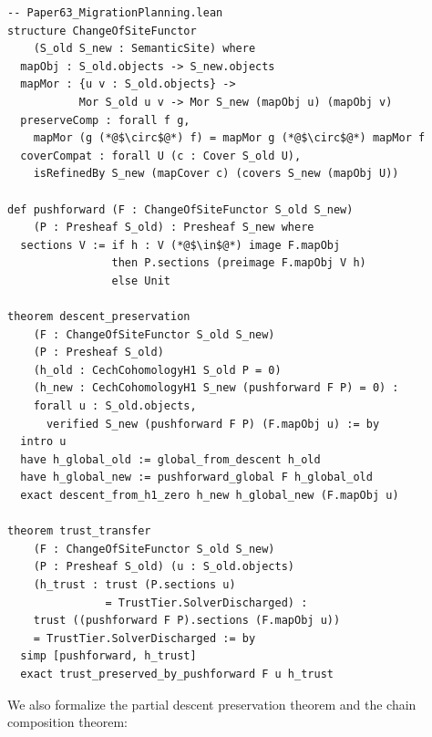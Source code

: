 \documentclass[11pt]{article}
\begin{document}
\begin{lstlisting}[style=jugeo-python,title=Lean 4 Formalization Sketch]
-- Paper63_MigrationPlanning.lean
structure ChangeOfSiteFunctor
    (S_old S_new : SemanticSite) where
  mapObj : S_old.objects -> S_new.objects
  mapMor : {u v : S_old.objects} ->
           Mor S_old u v -> Mor S_new (mapObj u) (mapObj v)
  preserveComp : forall f g,
    mapMor (g (*@$\circ$@*) f) = mapMor g (*@$\circ$@*) mapMor f
  coverCompat : forall U (c : Cover S_old U),
    isRefinedBy S_new (mapCover c) (covers S_new (mapObj U))

def pushforward (F : ChangeOfSiteFunctor S_old S_new)
    (P : Presheaf S_old) : Presheaf S_new where
  sections V := if h : V (*@$\in$@*) image F.mapObj
                then P.sections (preimage F.mapObj V h)
                else Unit

theorem descent_preservation
    (F : ChangeOfSiteFunctor S_old S_new)
    (P : Presheaf S_old)
    (h_old : CechCohomologyH1 S_old P = 0)
    (h_new : CechCohomologyH1 S_new (pushforward F P) = 0) :
    forall u : S_old.objects,
      verified S_new (pushforward F P) (F.mapObj u) := by
  intro u
  have h_global_old := global_from_descent h_old
  have h_global_new := pushforward_global F h_global_old
  exact descent_from_h1_zero h_new h_global_new (F.mapObj u)

theorem trust_transfer
    (F : ChangeOfSiteFunctor S_old S_new)
    (P : Presheaf S_old) (u : S_old.objects)
    (h_trust : trust (P.sections u)
               = TrustTier.SolverDischarged) :
    trust ((pushforward F P).sections (F.mapObj u))
    = TrustTier.SolverDischarged := by
  simp [pushforward, h_trust]
  exact trust_preserved_by_pushforward F u h_trust
\end{lstlisting}

We also formalize the partial descent preservation theorem and the chain
composition theorem:
\end{document}
